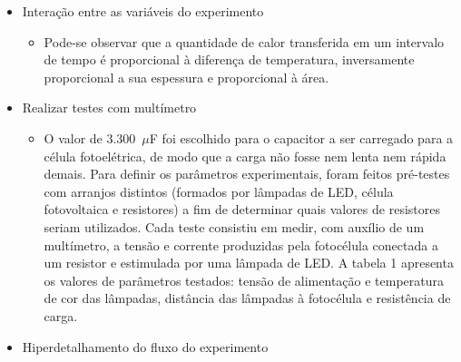 \documentclass{article}
\begin{document}
\begin{itemize}
\begin{itemize}
\begin{itemize}
		\end{itemize}
		\item Interação entre as variáveis do experimento
		\begin{itemize}
			\item Pode-se observar que a quantidade de calor transferida em um intervalo de tempo é proporcional à diferença de temperatura, inversamente proporcional a sua espessura e proporcional à área. \cite{newton}
		\end{itemize}
		\item Realizar testes com multímetro
		\begin{itemize}
			\item O valor de 3.300~$\mu$F foi escolhido para o capacitor a ser carregado para a célula fotoelétrica, de modo que a carga não fosse nem lenta nem rápida demais. Para definir os parâmetros experimentais, foram feitos pré-testes com arranjos distintos (formados por lâmpadas de LED, célula fotovoltaica e resistores) a fim de determinar quais valores de resistores seriam utilizados. Cada teste consistiu em medir, com auxílio de um multímetro, a tensão e corrente produzidas pela fotocélula conectada a um resistor e estimulada por uma lâmpada de LED. A tabela 1 apresenta os valores de parâmetros testados: tensão de alimentação e temperatura de cor das lâmpadas, distância das lâmpadas à fotocélula e resistência de carga. \cite{rogerio}
		\end{itemize}
		\item Hiperdetalhamento do fluxo do experimento
		\begin{itemize}

\end{itemize}
\end{itemize}
\end{itemize}
\end{document}
